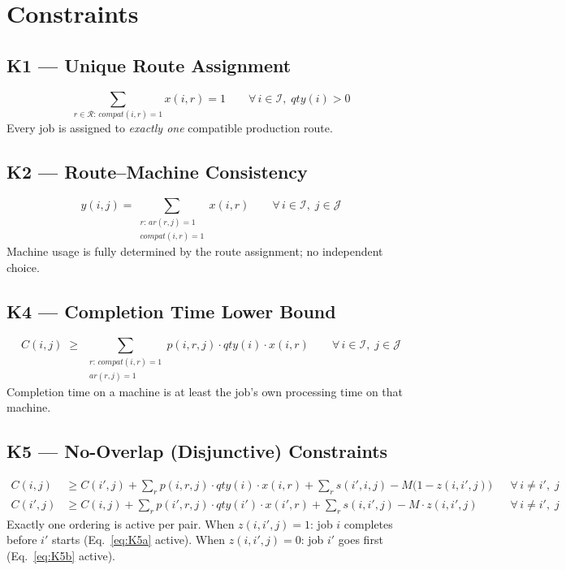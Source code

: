 \documentclass[11pt,a4paper]{article}
\begin{document}
\section{Constraints}

\subsection{K1 — Unique Route Assignment}
\begin{equation}
  \sum_{r \in \mathcal{R}:\, \mathit{compat}(i,r)=1} x(i,r) = 1
  \qquad \forall\, i \in \mathcal{I},\; \mathit{qty}(i)>0
\end{equation}
Every job is assigned to \emph{exactly one} compatible production route.

\subsection{K2 — Route–Machine Consistency}
\begin{equation}
  y(i,j) = \sum_{\substack{r:\, \mathit{ar}(r,j)=1 \\ \mathit{compat}(i,r)=1}} x(i,r)
  \qquad \forall\, i \in \mathcal{I},\; j \in \mathcal{J}
\end{equation}
Machine usage is fully determined by the route assignment; no independent choice.

\subsection{K4 — Completion Time Lower Bound}
\begin{equation}
  C(i,j) \;\geq\; \sum_{\substack{r:\, \mathit{compat}(i,r)=1 \\ \mathit{ar}(r,j)=1}}
    p(i,r,j)\cdot \mathit{qty}(i)\cdot x(i,r)
  \qquad \forall\, i \in \mathcal{I},\; j \in \mathcal{J}
\end{equation}
Completion time on a machine is at least the job's own processing time on that machine.

\subsection{K5 — No-Overlap (Disjunctive) Constraints}
\begin{align}
  C(i,j) &\geq C(i',j)
    + \sum_{r} p(i,r,j)\cdot\mathit{qty}(i)\cdot x(i,r)
    + \sum_{r} s(i',i,j)
    - M\bigl(1 - z(i,i',j)\bigr)
  &&\forall\, i \neq i',\; j \label{eq:K5a}\\[4pt]
  C(i',j) &\geq C(i,j)
    + \sum_{r} p(i',r,j)\cdot\mathit{qty}(i')\cdot x(i',r)
    + \sum_{r} s(i,i',j)
    - M\cdot z(i,i',j)
  &&\forall\, i \neq i',\; j \label{eq:K5b}
\end{align}
Exactly one ordering is active per pair. When $z(i,i',j)=1$: job $i$ completes before $i'$ starts (Eq.~\ref{eq:K5a} active). When $z(i,i',j)=0$: job $i'$ goes first (Eq.~\ref{eq:K5b} active).
\end{document}
